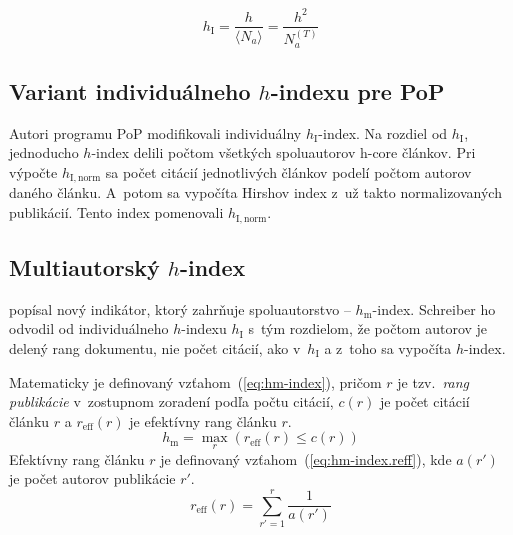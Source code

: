 \begin{equation}
\label{eq:hi-index}
h_{\mathrm{I}} = \frac{h}{\langle N_a \rangle} = \frac{h^2}{N_a^{(T)}}
\end{equation}


\subsection{Variant individuálneho $h$-indexu pre PoP}
\label{sec:hinorm}

Autori programu PoP modifikovali individuálny
$h_{\mathrm{I}}$-index.  Na rozdiel od $h_{\mathrm{I}}$, jednoducho $h$-index
delili počtom všetkých spoluautorov h-core článkov.  Pri výpočte
$h_{\mathrm{I, norm}}$ sa počet citácií jednotlivých článkov podelí počtom
autorov daného článku.  A~potom sa vypočíta Hirshov index z~už takto
normalizovaných publikácií.  Tento index pomenovali $h_{\mathrm{I, norm}}$.


\subsection{Multiautorský $h$-index}
\label{sec:hm-index}

\citet{Schreiber2008} popísal nový indikátor, ktorý zahrňuje spoluautorstvo --
$h_{\mathrm{m}}$-index.  Schreiber ho odvodil od individuálneho $h$-indexu
$h_{\mathrm{I}}$ s~tým rozdielom, že počtom autorov je delený rang dokumentu,
nie počet citácií, ako v~$h_{\mathrm{I}}$ a z~toho sa vypočíta $h$-index.

Matematicky je definovaný vzťahom~(\ref{eq:hm-index}), pričom $r$ je
tzv.~\emph{rang publikácie} v~zostupnom zoradení podľa počtu citácií, $c(r)$ je
počet citácií článku $r$ a $r_{\mathrm{eff}}(r)$ je efektívny rang článku $r$.
\begin{equation}
\label{eq:hm-index}
h_{\mathrm{m}} = \max_r{(r_{\mathrm{eff}}(r) \leq c(r))}
\end{equation}
Efektívny rang článku $r$ je definovaný vzťahom~(\ref{eq:hm-index.reff}), kde
$a(r')$ je počet autorov publikácie $r'$.
\begin{equation}
\label{eq:hm-index.reff}
r_{\mathrm{eff}}(r) = \sum_{r'=1}^r{\frac{1}{a(r')}}
\end{equation}


